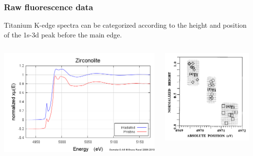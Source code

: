 \documentclass[10pt, xcolor=x11names, compress]{beamer}
\begin{document}
\begin{frame}
  \frametitle{Raw fluorescence data}

  Titanium K-edge spectra can be categorized according to the height
  and position of the 1s-3d peak before the main edge.

  \begin{columns}
    \begin{column}{0.5\linewidth}
      \includegraphics[width=\linewidth]{images/pristine_irrad.png}
    \end{column}
    \begin{column}{0.5\linewidth}
      \begin{center}
        \includegraphics[width=0.8\linewidth]{images/farges.png}
      \end{center}
    \end{column}
  \end{columns}


\end{frame}
\end{document}
